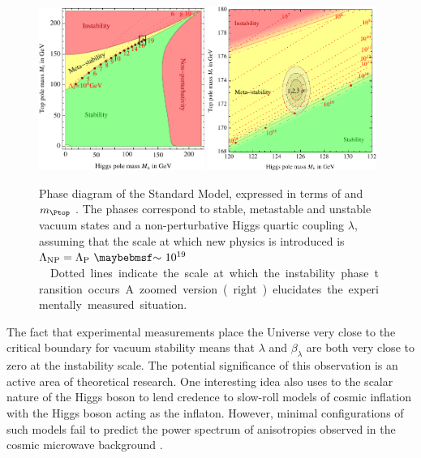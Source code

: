 \begin{figure}[t]
	\includegraphics[width=0.48\textwidth]{tex/conclusions/vacuum_stability}
	\hfill
	\includegraphics[width=0.49\textwidth]{tex/conclusions/vacuum_stability_zoom}
	\caption{Phase diagram of the Standard Model, expressed in terms of \mH and 
	$m_{\Ptop}$ \cite{Degrassi:vacuum}. The phases correspond to stable, metastable and 
	unstable vacuum states and a non-perturbative Higgs quartic coupling $\lambda$, 
	assuming that the scale at which new physics is introduced is 
	\unit{$\Lambda_{\text{NP}} = \Lambda_{\text{P}}~\about~10^{19}$}{\GeV}. Dotted lines 
	indicate the scale at which the instability phase transition occurs. A zoomed version 
	(right) elucidates the experimentally measured situation.}
	\label{fig:concl:vacuum_stability}
\end{figure}

The fact that experimental measurements place the Universe very close to the critical 
boundary for vacuum stability means that $\lambda$ and $\beta_{\lambda}$ are both very 
close to zero at the instability scale. The potential significance of this observation is 
an active area of theoretical research. One interesting idea also uses to the scalar 
nature of the Higgs boson to lend credence to slow-roll models of cosmic inflation with 
the Higgs boson acting as the inflaton. However, minimal configurations of such models 
fail to predict the power spectrum of anisotropies observed in the cosmic microwave 
background \cite{Isidori:2007}.



